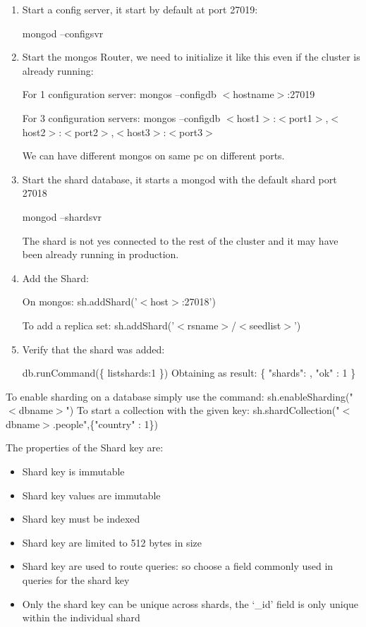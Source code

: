 \documentclass[a4page, 11pt]{article}
\begin{document}
\begin{enumerate}[noitemsep]
	\item Start a config server, it start by default at port 27019:

	mongod --configsvr
	\item Start the mongos Router, we need to initialize it like this even if the cluster is already running:
	
	For 1 configuration server: 
	mongos --configdb $<$hostname$>$:27019
	
	For 3 configuration servers:
	mongos --configdb $<$host1$>$:$<$port1$>$,$<$host2$>$:$<$port2$>$,$<$host3$>$:$<$port3$>$
	
	We can have different mongos on same pc on different ports.
	\item Start the shard database, it starts a mongod with the default shard port 27018
	
	mongod --shardsvr
	
	The shard is not yes connected to the rest of the cluster and it may have been already running in production.
	\item Add the Shard:
	
	On mongos: 
	sh.addShard('$<$host$>$:27018')
	
	To add a replica set: 
	sh.addShard('$<$rsname$>$/$<$seedlist$>$')
	\item Verify that the shard was added:
	
	db.runCommand(\{ listshards:1 \}) \newline
	Obtaining as result: \newline
	\{\newline
	"shards": , \newline
	"ok" : 1 \newline
	\}
\end{enumerate} 
To enable sharding on a database simply use the command: sh.enableSharding("$<$dbname$>$") 
\newline To start a collection with the given key:
sh.shardCollection("$<$dbname$>.$people",\{"country" : 1\})

The properties of the Shard key are:
\begin{itemize}[noitemsep]
	\item Shard key is immutable
	\item Shard key values are immutable
	\item Shard key must be indexed
	\item Shard key are limited to 512 bytes in size
	\item Shard key are used to route queries: so choose a field commonly used in queries for the shard key
	\item Only the shard key can be unique across shards, the `\_id' field is only unique within the individual shard
\end{itemize}
\end{document}
